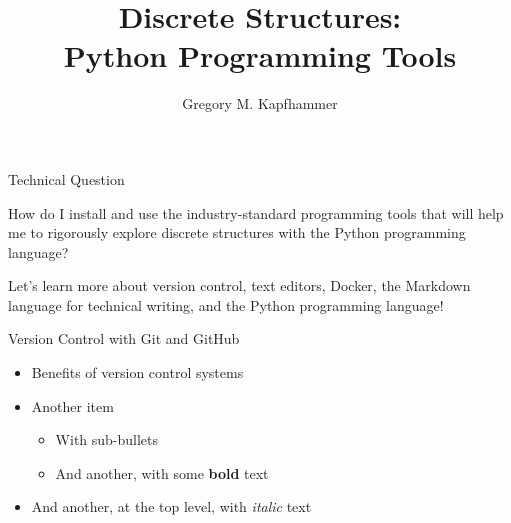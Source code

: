 \documentclass[14pt,aspectratio=169]{beamer}
\title{Discrete Structures: \\ Python Programming Tools}
\author{Gregory M. Kapfhammer}
\institute[shortinst]{Department of Computer Science, Allegheny College}
\begin{document}
{
  \begin{frame}
    \titlepage
  \end{frame}
}


\begin{frame}{Technical Question}

  \begin{center}
    {\large How do I install and use the industry-standard programming tools that will
    help me to rigorously explore discrete structures with the Python
  programming language?}
  \end{center}

  \vspace{2ex}

  \begin{center}
    \small Let's learn more about version control, text editors, Docker,
    the Markdown language for technical writing, and the Python programming
    language!
  \end{center}

\end{frame}


\begin{frame}{Version Control with Git and GitHub}

  \begin{itemize}
    \item Benefits of version control systems
    \item Another item
      \begin{itemize}
        \item With sub-bullets
        \item And another, with some \textbf{bold} text
      \end{itemize}
    \item And another, at the top level, with \textit{italic} text
  \end{itemize}


\end{frame}
\end{document}
